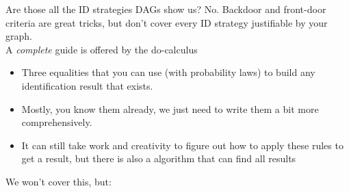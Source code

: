 \documentclass[xcolor=dvipsnames]{beamer}
\begin{document}
\begin{frame}{Are those all the ID strategies DAGs show us?}
 No. Backdoor and front-door criteria are great tricks, but don't cover every ID strategy justifiable by your graph. \\
\bigskip
{} A \textit{complete} guide is offered by the do-calculus\\
\small
\begin{itemize}
\item Three equalities that you can use (with probability laws) to build any identification result that exists. 
\item Mostly, you know them already, we just need to write them a bit more comprehensively. 
\item It can still take work and creativity to figure out how to apply these rules to get a result, but there is also a algorithm that can find all results
\end{itemize}
\bigskip
{} We won't cover this, but:
\end{frame}
%
%
\end{document}
